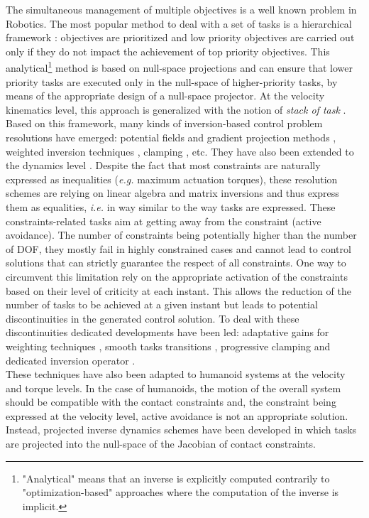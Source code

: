 \documentclass[12pt,a4paper,twoside]{article}
\begin{document}
The simultaneous management of multiple objectives is a well known problem in Robotics. The most popular method to deal with a set of tasks is a hierarchical framework \cite{Liegeois1977}: objectives are prioritized and low priority objectives are carried out only if they do not impact the achievement of top priority objectives. This analytical\footnote{"Analytical" means that an inverse is explicitly computed contrarily to "optimization-based" approaches where the computation of the inverse is implicit.} method is based on null-space projections and can ensure that lower priority tasks are executed only in the null-space of higher-priority tasks, by means of the appropriate design of a null-space projector. At the velocity kinematics level, this approach is generalized with the notion of \textit{stack of task} \cite{Mansard2007}. Based on this framework, many kinds of inversion-based control problem resolutions have emerged: potential fields and gradient projection methods \cite{Khatib1986,Maciejewski1985}, weighted inversion techniques \cite{Chan1995,Huo2011}, clamping \cite{Baerlocher2004}, etc. They have also been extended to the dynamics level \cite{Khatib1986,Hsu89,Peters08}. Despite the fact that most constraints are naturally expressed as inequalities (\textit{e.g.} maximum actuation torques), these resolution schemes are    relying on linear algebra and matrix inversions and thus express them as equalities, \textit{i.e.} in way similar to the way tasks are expressed. These constraints-related tasks aim at getting away from the constraint (active avoidance). The number of constraints being potentially higher than the number of DOF, they mostly fail in highly constrained cases and cannot lead to control solutions that can strictly guarantee the respect of all constraints. One way to circumvent this limitation rely on the appropriate activation of the constraints based on their level of criticity at each instant. This allows the reduction of the number of tasks to be achieved at a given instant but leads to potential discontinuities in the generated control solution. To deal with these discontinuities dedicated developments have been led: adaptative gains for weighting techniques \cite{Chaumette2001}, smooth tasks transitions \cite{Padois2007}, progressive clamping \cite{Raunhardt2007} and dedicated inversion operator \cite{Mansard2009a}.\\

These techniques have also been adapted to humanoid systems at the velocity \cite{Mistry07,Mistry08} and torque \cite{Sentis04bis} levels. In the case of humanoids, the motion of the overall system should be compatible with the contact constraints and, the constraint being expressed at the velocity level, active avoidance is not an appropriate solution. Instead, projected inverse dynamics schemes have been developed \cite{Aghili05,Khatib08,Sentis10,Righetti_IJORR_2013,DelPreteThesis2013} in which tasks are projected into the null-space of the Jacobian of contact constraints.\\
\end{document}
